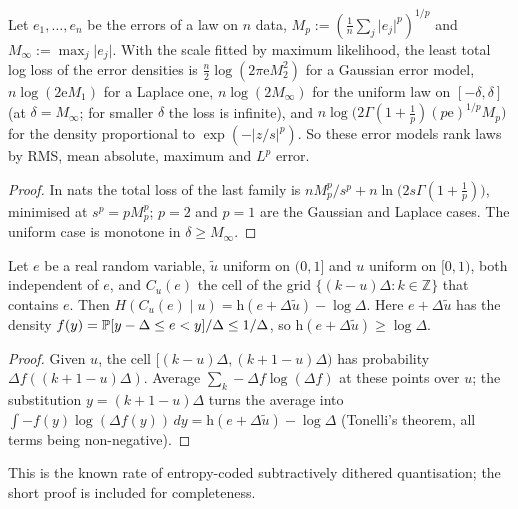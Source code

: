\begin{proposition}\label{prop:laws:fitted}
Let $e_1,\dots,e_n$ be the errors of a law on $n$ data, $M_p:=(\frac1n\sum_j\lvert e_j\rvert^p)^{1/p}$ and $M_\infty:=\max_j\lvert e_j\rvert$. With the scale fitted by maximum likelihood, the least total log loss of the error densities is $\frac n2\log(2\pi\mathrm eM_2^2)$ for a Gaussian error model, $n\log(2\mathrm eM_1)$ for a Laplace one, $n\log(2M_\infty)$ for the uniform law on $[-\delta,\delta]$ (at $\delta=M_\infty$; for smaller $\delta$ the loss is infinite), and $n\log\big(2\Gamma(1+\frac1p)(p\mathrm e)^{1/p}M_p\big)$ for the density proportional to $\exp(-\lvert z/s\rvert^p)$. So these error models rank laws by RMS, mean absolute, maximum and $L^p$ error.
\end{proposition}

\begin{proof}
In nats the total loss of the last family is $nM_p^p/s^p+n\ln\big(2s\Gamma(1+\frac1p)\big)$, minimised at $s^p=pM_p^p$; $p=2$ and $p=1$ are the Gaussian and Laplace cases. The uniform case is monotone in $\delta\ge M_\infty$.
\end{proof}

\begin{lemma}\label{lem:laws:dither}
Let $e$ be a real random variable, $\tilde u$ uniform on $(0,1]$ and $u$ uniform on $[0,1)$, both independent of $e$, and $C_u(e)$ the cell of the grid $\{(k-u)\Delta:k\in\mathbb Z\}$ that contains $e$. Then $H(C_u(e)\mid u)=\mathrm h(e+\Delta\tilde u)-\log\Delta$. Here $e+\Delta\tilde u$ has the density $f(y)=\mathbb{P}[y-\Delta\le e<y]/\Delta\le1/\Delta$, so $\mathrm h(e+\Delta\tilde u)\ge\log\Delta$.
\end{lemma}

\begin{proof}
Given $u$, the cell $[(k-u)\Delta,(k+1-u)\Delta)$ has probability $\Delta f((k+1-u)\Delta)$. Average $\sum_k-\Delta f\log(\Delta f)$ at these points over $u$; the substitution $y=(k+1-u)\Delta$ turns the average into $\int-f(y)\log(\Delta f(y))\,dy=\mathrm h(e+\Delta\tilde u)-\log\Delta$ (Tonelli's theorem, all terms being non-negative).
\end{proof}

This is the known rate of entropy-coded subtractively dithered quantisation; the short proof is included for completeness.

